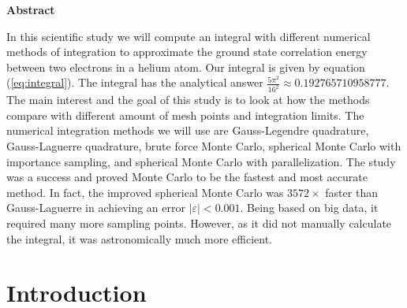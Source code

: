 \documentclass{article}
\begin{document}
\vspace{1cm}


\begin{center}

{\Large\textbf{Abstract}} \label{sec:Abstract}

\end{center}

\vspace{5mm}

In this scientific study we will compute an integral with different numerical methods of integration to approximate the ground state correlation energy between two electrons in a helium atom. Our integral is given by equation (\ref{eq:integral}). The integral has the analytical answer $\frac{5 \pi^2}{16^2} \approx 0.192765710958777$. The main interest and the goal of this study is to look at how the methods compare with different amount of mesh points and integration limits. The numerical integration methods we will use are Gauss-Legendre quadrature, Gauss-Laguerre quadrature, brute force Monte Carlo, spherical Monte Carlo with importance sampling, and spherical Monte Carlo with parallelization. The study was a success and proved Monte Carlo to be the fastest and most accurate method. In fact, the improved spherical Monte Carlo was $3572\times$ faster than Gauss-Laguerre in achieving an error $|\varepsilon|<0.001$. Being based on big data, it required many more sampling points. However, as it did not manually calculate the integral, it was astronomically much more efficient. \\



\newpage


\vspace{1cm}

\tableofcontents

\vspace{1cm}

\vspace{1cm}

\section{Introduction} \label{sec:Introduction}
\end{document}

